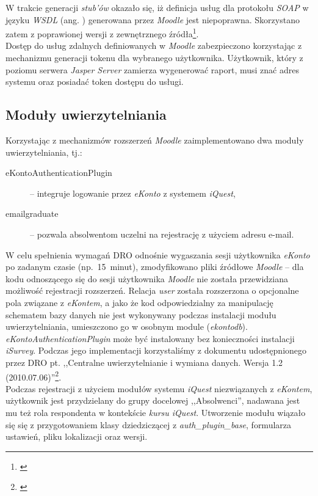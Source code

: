 W trakcie generacji \textit{stub'ów} okazało się, iż definicja usług dla protokołu \textit{SOAP} w języku \textit{WSDL} (ang. ) generowana przez \textit{Moodle} jest niepoprawna. Skorzystano zatem z poprawionej wersji z zewnętrznego źródła\footnote{\cite{GITHUB:MoodleSoap}}. \\

Dostęp do usług zdalnych definiowanych w \textit{Moodle} zabezpieczono korzystając z mechanizmu generacji tokenu dla wybranego użytkownika. Użytkownik, który z poziomu serwera \textit{Jasper Server} zamierza wygenerować raport, musi znać adres systemu oraz posiadać token dostępu do usługi.

\subsection{Moduły uwierzytelniania}
\label{Chapter662}

Korzystając z mechanizmów rozszerzeń \textit{Moodle} zaimplementowano dwa moduły uwierzytelniania, tj.:

\begin{description}
\item[eKontoAuthenticationPlugin] -- integruje logowanie przez \textit{eKonto} z systemem \textit{iQuest},
\item[emailgraduate] -- pozwala absolwentom uczelni na rejestrację z użyciem adresu e-mail.
\end{description}

W celu spełnienia wymagań DRO odnośnie wygaszania sesji użytkownika \textit{eKonto} po zadanym czasie (np.~15~minut), zmodyfikowano pliki źródłowe \textit{Moodle} -- dla kodu odnoszącego się do sesji użytkownika \textit{Moodle} nie została przewidziana możliwość rejestracji rozszerzeń. Relacja \textit{user} została rozszerzona o opcjonalne pola związane z \textit{eKontem}, a jako że kod odpowiedzialny za manipulację schematem bazy danych nie jest wykonywany podczas instalacji modułu uwierzytelniania, umieszczono go w osobnym module (\textit{ekontodb}). \textit{eKontoAuthenticationPlugin} może być instalowany bez konieczności instalacji \textit{iSurvey}. Podczas jego implementacji korzystaliśmy z dokumentu udostępnionego przez DRO pt. ,,Centralne uwierzytelnianie i wymiana danych. Wersja 1.2 (2010.07.06)''\footnote{\cite{PP:CUiWD10}}. \\

Podczas rejestracji z użyciem modułów systemu \textit{iQuest} niezwiązanych z \textit{eKontem}, użytkownik jest przydzielany do grupy docelowej ,,Absolwenci'', nadawana jest mu też rola respondenta w kontekście \textit{kursu iQuest}. Utworzenie modułu wiązało się się z przygotowaniem klasy dziedziczącej z \textit{auth\_plugin\_base}, formularza ustawień, pliku lokalizacji oraz wersji.

